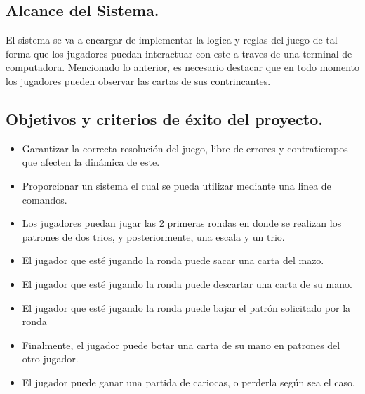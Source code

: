 \subsection{Alcance del Sistema.}\label{cap:alcance}
El sistema se va a encargar de implementar la logica y reglas del juego de tal forma que los jugadores puedan
interactuar con este a traves de una terminal de computadora. Mencionado lo anterior, es necesario destacar 
que en todo momento los jugadores pueden observar las cartas de sus contrincantes.

\subsection{Objetivos y criterios de éxito del proyecto.}\label{cap:objetivos}
\begin{itemize}
    \item Garantizar la correcta resolución del juego, libre de errores y contratiempos que afecten la dinámica de este.
    \item Proporcionar un sistema el cual se pueda utilizar mediante una linea de comandos.
    \item Los jugadores puedan jugar las 2 primeras rondas en donde se realizan los patrones de dos trios, y posteriormente, una
    escala y un trio.
    \item El jugador que esté jugando la ronda puede sacar una carta del mazo.
    \item El jugador que esté jugando la ronda puede descartar una carta de su mano.
    \item El jugador que esté jugando la ronda puede bajar el patrón solicitado por la ronda
    \item Finalmente, el jugador puede botar una carta de su mano en patrones del otro jugador.
    \item El jugador puede ganar una partida de cariocas, o perderla según sea el caso.
\end{itemize}


